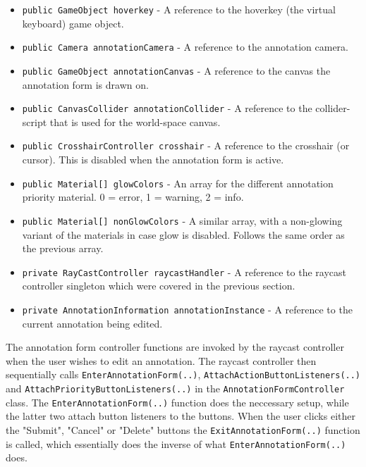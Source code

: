 \begin{itemize}
    \item \texttt{public GameObject hoverkey} - A reference to the hoverkey (the virtual keyboard) game object.
    \item \texttt{public Camera annotationCamera} - A reference to the annotation camera.
    \item \texttt{public GameObject annotationCanvas} - A reference to the canvas the annotation form is drawn on.
    \item \texttt{public CanvasCollider annotationCollider} - A reference to the collider-script that is used for the world-space canvas. 
    \item \texttt{public CrosshairController crosshair} - A reference to the crosshair (or cursor). This is disabled when the annotation form is active.
    \item \texttt{public Material[] glowColors} - An array for the different annotation priority material.  0 = error, 1 = warning, 2 = info.
    \item \texttt{public Material[] nonGlowColors} - A similar array, with a non-glowing variant of the materials in case glow is disabled. Follows the same order as the previous array.
    \item \texttt{private RayCastController raycastHandler} - A reference to the raycast controller singleton which were covered in the previous section.
    \item \texttt{private AnnotationInformation annotationInstance} - A reference to the current annotation being edited.
\end{itemize}

The annotation form controller functions are invoked by the raycast controller when the user wishes to edit an annotation. 
The raycast controller then sequentially calls \texttt{Enter\-Annotation\-Form(..)}, \texttt{Attach\-Action\-Button\-Listeners(..)} and 
\texttt{Attach\-Priority\-Button\-Listeners(..)} in the \texttt{Annotation\-Form\-Controller} class. The \texttt{Enter\-Annotation\-Form(..)} function
does the neccessary setup, while the latter two attach button listeners to the buttons. When the user clicks either the 
"Submit", "Cancel" or "Delete" buttons the \texttt{Exit\-Annotation\-Form(..)} function is called, which essentially does the inverse
of what \texttt{Enter\-Annotation\-Form(..)} does. 

